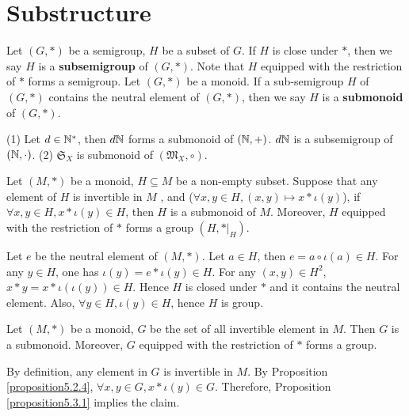 \documentclass{book}
\numberwithin{equation}{section}
\begin{document}
\section{Substructure}
\begin{definitionenv}
    Let $(G, *)$ be a semigroup,  $H$ be a subset of $G$. If $H$ is close under $*$,  then we say $H$ is a \textbf{subsemigroup} of $(G, *)$. Note that $H$ equipped with the restriction of $*$ forms a semigroup.
    Let $(G, *)$ be a monoid. If a sub-semigroup $H$ of $(G, *)$ contains the neutral element of $(G, *)$,  then we say $H$ is a \textbf{submonoid} of $(G, *)$.
\end{definitionenv}
\begin{exampleenv}
   \quad
   \newline
   (1) Let $d\in \mathbb{N}^*$,  then $d\mathbb{N}$ forms a submonoid of $(\mathbb{N}, +)$.
   $d\mathbb{N}$ is a subsemigroup of $(\mathbb{N}, \cdot)$.
    \newline
    (2) $\mathfrak{S} _X$ is submonoid of $(\mathfrak{M} _X, \circ)$.
\end{exampleenv}
\begin{propositionenv}\label{proposition5.3.1}
    Let $(M, *)$ be a monoid,  $H\subseteq M$ be a non-empty subset. Suppose that any element of $H$ is invertible in $M$ ,  and ($\forall x, y \in H, (x, y)\mapsto x*\iota(y)$),  if $\forall x, y\in H,  x*\iota(y)\in H$,  then $H$ is a submonoid of $M$. Moreover,  $H$ equipped with the restriction of $*$ forms a group $(H, *|_H)$. 
\end{propositionenv}
\begin{proofenv}
    Let $e$ be the neutral element of $(M, *)$. Let $a\in H$,  then $e=a\circ\iota(a)\in H$. For any $y\in H$,  one has $\iota(y)=e*\iota(y)\in H$. For any $(x, y)\in H^2$,  $x*y=x*\iota(\iota(y))\in H$. Hence $H$ is closed under $*$ and it contains the neutral element. Also,  $\forall y\in H,  \iota(y)\in H$,  hence $H$ is group. 
\end{proofenv}
\begin{corollaryenv}
    Let $(M, *)$ be a monoid,  $G$ be the set of all invertible element in $M$. Then $G$ is a submonoid. Moreover,  $G$ equipped with the restriction of $*$ forms a group.
\end{corollaryenv}
\begin{proofenv}
    By definition,  any element in $G$ is invertible in $M$. By Proposition \ref{proposition5.2.4},  $\forall x, y\in G,  x*\iota(y)\in G$. Therefore,  Proposition \ref{proposition5.3.1} implies the claim.
\end{proofenv}
\end{document}
